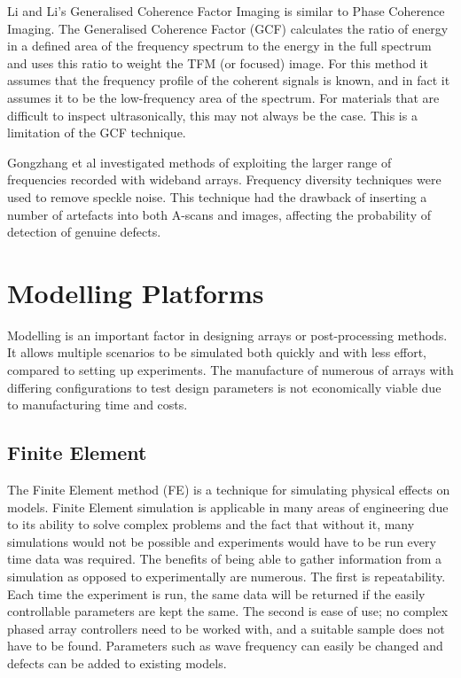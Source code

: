 Li and Li's Generalised Coherence Factor Imaging is similar to Phase Coherence Imaging\cite{li_adaptive_2003}. The Generalised Coherence Factor (GCF) calculates the ratio of energy in a defined area of the frequency spectrum to the energy in the full spectrum and uses this ratio to weight the TFM (or focused) image. For this method it assumes that the frequency profile of the coherent signals is known, and in fact it assumes it to be the low-frequency area of the spectrum. For materials that are difficult to inspect ultrasonically, this may not always be the case. This is a limitation of the GCF technique.

Gongzhang et al investigated methods of exploiting the larger range of frequencies recorded with wideband arrays. Frequency diversity techniques were used to remove speckle noise. This technique had the drawback of inserting a number of artefacts into both A-scans and images, affecting the probability of detection of genuine defects\cite{gongzhang_robust_2014,gongzhang_robust_2012}.

\section{Modelling Platforms}

Modelling is an important factor in designing arrays or post-processing methods. It allows multiple scenarios to be simulated both quickly and with less effort, compared to setting up experiments. The manufacture of numerous of arrays with differing configurations to test design parameters is not economically viable due to manufacturing time and costs.

\subsection{Finite Element}

The Finite Element method (FE) is a technique for simulating physical effects on models. Finite Element simulation is applicable in many areas of engineering due to its ability to solve complex problems and the fact that without it, many simulations would not be possible and experiments would have to be run every time data was required\cite{banerjee_elastic_2006}. The benefits of being able to gather information from a simulation as opposed to experimentally are numerous. The first is repeatability. Each time the experiment is run, the same data will be returned if the easily controllable parameters are kept the same. The second is ease of use; no complex phased array controllers need to be worked with, and a suitable sample does not have to be found. Parameters such as wave frequency can easily be changed and defects can be added to existing models.

